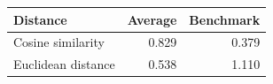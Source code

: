
\begin{tabular}{lrr}
\toprule
Distance & Average & Benchmark\\
\midrule
Cosine similarity & 0.829 & 0.379\\
Euclidean distance & 0.538 & 1.110\\
\bottomrule
\end{tabular}
